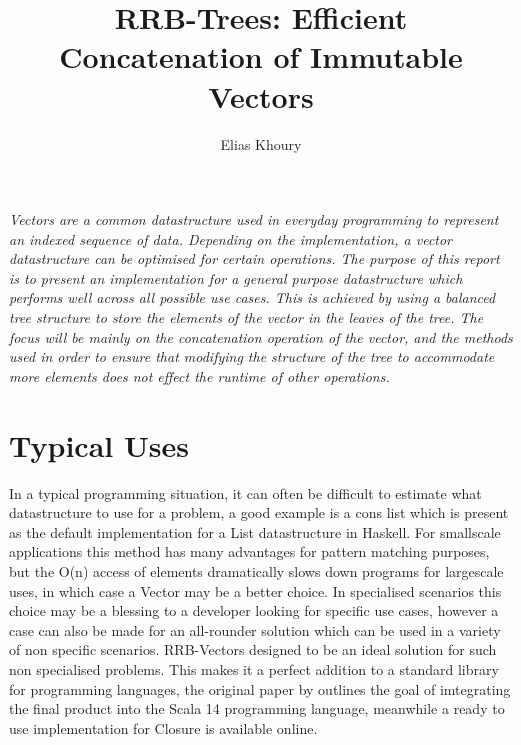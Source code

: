 \documentclass[11pt,a4paper,oneside]{article}
\title {RRB-Trees: Efficient Concatenation of Immutable Vectors}
\author {Elias Khoury}
\begin{document}
\maketitle

\textit{
Vectors are a common datastructure used in everyday programming to represent an indexed sequence of data. Depending on the implementation, a vector datastructure can be optimised for certain operations. The purpose of this report is to present an implementation for a general purpose datastructure which performs well across all possible use cases. This is achieved by using a balanced tree structure to store the elements of the vector in the leaves of the tree. The focus will be mainly on the concatenation operation of the vector, and the methods used in order to ensure that modifying the structure of the tree to accommodate more elements does not effect the runtime of other operations. 
}

\pagebreak

\tableofcontents

\pagebreak


\section{Typical Uses}

In a typical programming situation, it can often be difficult to estimate what datastructure to use for a problem, a good example is a cons list which is present as the default implementation for a List datastructure in Haskell. For smallscale applications this method has many advantages for pattern matching purposes, but the O(n) access of elements dramatically slows down programs for largescale uses, in which case a Vector may be a better choice. In specialised scenarios this choice may be a blessing to a developer looking for specific use cases, however a case can also be made for an all-rounder solution which can be used in a variety of non specific scenarios. RRB-Vectors designed to be an ideal solution for such non specialised problems.  This makes it a perfect addition to a standard library for programming languages, the original paper by \cite{bagwell2011rrb} outlines the goal of imtegrating the final product into the Scala 14 programming language, meanwhile a ready to use implementation for Closure is available online\citep{marczyk2012clojure}.
\end{document}
